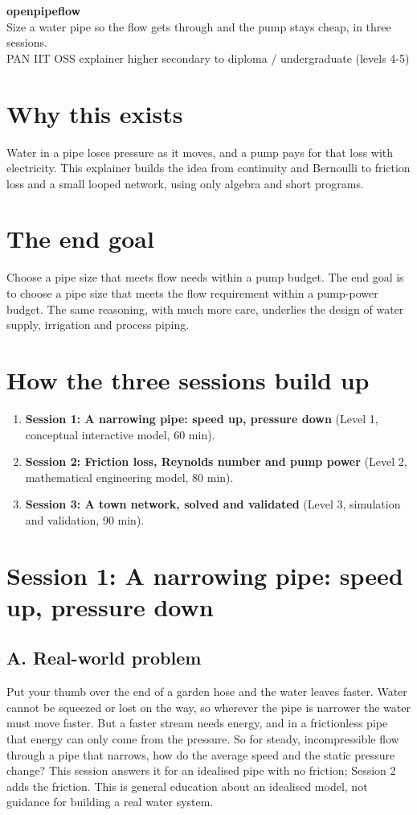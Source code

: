 \documentclass[11pt,a4paper]{article}
\begin{document}
\begin{center}{\LARGE\bfseries openpipeflow}\\[0.4em]{\large Size a water pipe so the flow gets through and the pump stays cheap, in three sessions.}\\[0.2em]\small PAN IIT OSS explainer \textbullet{} higher secondary to diploma / undergraduate (levels 4-5)\end{center}

\section*{Why this exists}
Water in a pipe loses pressure as it moves, and a pump pays for that loss with electricity. This explainer builds the idea from continuity and Bernoulli to friction loss and a small looped network, using only algebra and short programs.

\section*{The end goal}
Choose a pipe size that meets flow needs within a pump budget. The end goal is to choose a pipe size that meets the flow requirement within a pump-power budget. The same reasoning, with much more care, underlies the design of water supply, irrigation and process piping.

\section*{How the three sessions build up}
\begin{enumerate}[nosep]
\item \textbf{Session 1: A narrowing pipe: speed up, pressure down} (Level 1, conceptual interactive model, 60 min).
\item \textbf{Session 2: Friction loss, Reynolds number and pump power} (Level 2, mathematical engineering model, 80 min).
\item \textbf{Session 3: A town network, solved and validated} (Level 3, simulation and validation, 90 min).
\end{enumerate}

\section{Session 1: A narrowing pipe: speed up, pressure down}

\subsection*{A. Real-world problem}
Put your thumb over the end of a garden hose and the water leaves faster. Water cannot be squeezed or lost on the way, so wherever the pipe is narrower the water must move faster. But a faster stream needs energy, and in a frictionless pipe that energy can only come from the pressure. So for steady, incompressible flow through a pipe that narrows, how do the average speed and the static pressure change? This session answers it for an idealised pipe with no friction; Session 2 adds the friction. This is general education about an idealised model, not guidance for building a real water system.
\end{document}
